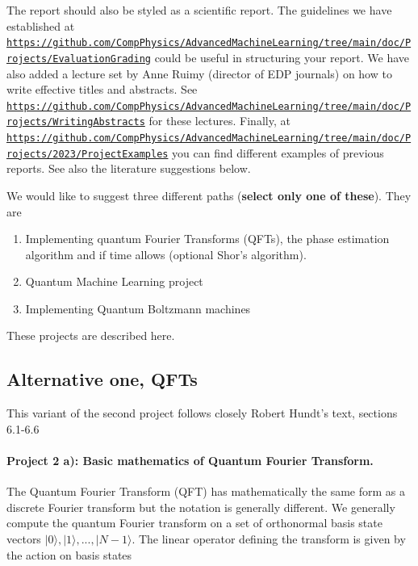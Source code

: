 \documentclass[%
oneside,                 %
final,                   %
10pt]{article}
\begin{document}
The report should also be styled as a scientific report. The guidelines
we have established at
\href{{https://github.com/CompPhysics/AdvancedMachineLearning/tree/main/doc/Projects/EvaluationGrading}}{\nolinkurl{https://github.com/CompPhysics/AdvancedMachineLearning/tree/main/doc/Projects/EvaluationGrading}}
could be useful in structuring your report. We have also added a
lecture set by Anne Ruimy (director of EDP journals) on how to write
effective titles and abstracts. See
\href{{https://github.com/CompPhysics/AdvancedMachineLearning/tree/main/doc/Projects/WritingAbstracts}}{\nolinkurl{https://github.com/CompPhysics/AdvancedMachineLearning/tree/main/doc/Projects/WritingAbstracts}}
for these lectures. Finally, at
\href{{https://github.com/CompPhysics/AdvancedMachineLearning/tree/main/doc/Projects/2023/ProjectExamples}}{\nolinkurl{https://github.com/CompPhysics/AdvancedMachineLearning/tree/main/doc/Projects/2023/ProjectExamples}}
you can find different examples of previous reports. See also the literature suggestions below.

We would like to suggest three different paths (\textbf{select only one of these}). They are

\begin{enumerate}
\item Implementing quantum Fourier Transforms (QFTs), the phase estimation algorithm and if time allows (optional Shor's algorithm).

\item Quantum Machine Learning project

\item Implementing Quantum Boltzmann machines
\end{enumerate}

\noindent
These projects are described here.

\subsection*{Alternative one, QFTs}

This variant of the second project follows closely Robert Hundt's text, sections 6.1-6.6

\paragraph{Project 2 a): Basic mathematics of  Quantum Fourier Transform.}
The Quantum Fourier Transform (QFT) has mathematically the same form as a discrete Fourier transform
but the notation is generally different. We generally compute the
quantum Fourier transform on a set of orthonormal basis state vectors
\(|0\rangle, |1\rangle, ..., |N-1\rangle\). The linear operator defining
the transform is given by the action on basis states
\end{document}
